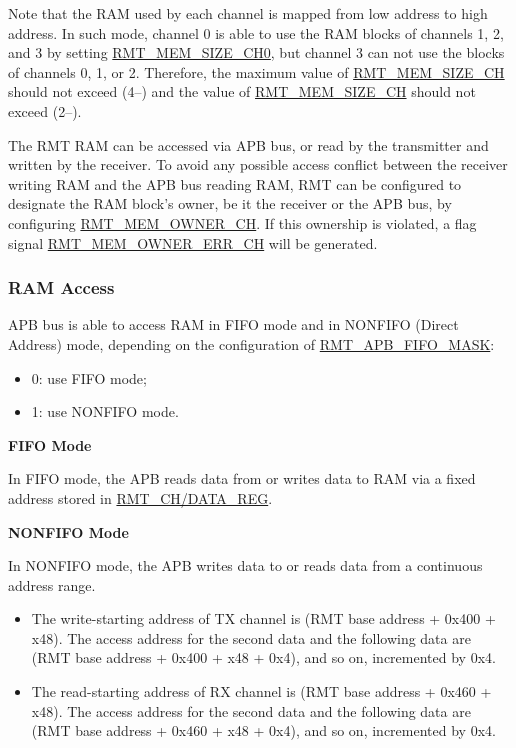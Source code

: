 \documentclass[main\_\_EN.tex]{subfiles}
\begin{document}
Note that the RAM used by each channel is mapped from low address to high address. In such mode, channel 0 is able to use the RAM blocks of channels 1, 2, and 3 by setting \hyperref[fielddesc:RMTMEMSIZECHN]{RMT\_MEM\_SIZE\_CH0}, but channel 3 can not use the blocks of channels 0, 1, or 2. Therefore, the maximum value of \hyperref[fielddesc:RMTMEMSIZECHN]{RMT\_MEM\_SIZE\_CH} should not exceed (4$–$) and the value of \hyperref[fielddesc:RMTMEMSIZECHM]{RMT\_MEM\_SIZE\_CH} should not exceed (2$–$).

The RMT RAM can be accessed via APB bus, or read by the transmitter and written by the receiver. To avoid any possible access conflict between the receiver writing RAM and the APB bus reading RAM, RMT can be configured to designate the RAM block's owner, be it the receiver or the APB bus, by configuring \hyperref[fielddesc:RMTMEMOWNERCHM]{RMT\_MEM\_OWNER\_CH}. If this ownership is violated, a flag signal \hyperref[fielddesc:RMTMEMOWNERERRCHM]{RMT\_MEM\_OWNER\_ERR\_CH} will be generated. 

\subsubsection{RAM Access}

APB bus is able to access RAM in FIFO mode and in NONFIFO (Direct Address) mode, depending on the configuration of \hyperref[fielddesc:RMTAPBFIFOMASK]{RMT\_APB\_FIFO\_MASK}:

\begin{itemize}
    \item 0: use FIFO mode;
    \item 1: use NONFIFO mode.
\end{itemize}

\textbf{FIFO Mode}

In FIFO mode, the APB reads data from or writes data to RAM via a fixed address stored in \hyperref[regdesc:RMTCHNDATAREG]{RMT\_CH/DATA\_REG}.

\textbf{NONFIFO Mode}

In NONFIFO mode, the APB writes data to or reads data from a continuous address range.
\begin{itemize}
    \item The write-starting address of TX channel  is (RMT base address + 0x400 + x48). The access address for the second data and the following data are (RMT base address + 0x400 + x48 + 0x4), and so on, incremented by 0x4. 
    \item The read-starting address of RX channel  is (RMT base address + 0x460 + x48). The access address for the second data and the following data are (RMT base address + 0x460 + x48 + 0x4), and so on, incremented by 0x4. 
\end{itemize}
\end{document}
